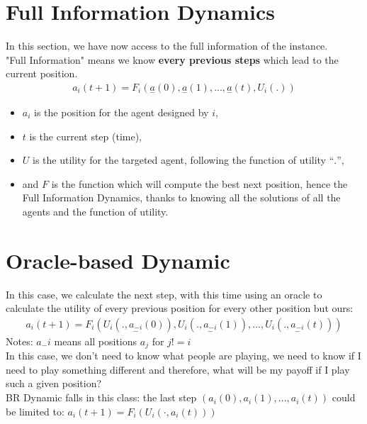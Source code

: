 \section{Full Information Dynamics}
In this section, we have now access to the full information of the instance.\\
"Full Information" means we know \textbf{every previous steps} which lead to the current position.
\begin{equation}\label{eq:10}
\begin{aligned}
a_i(t + 1) = F_i(\underset{-}{a}(0), \underset{-}{a}(1), ..., \underset{-}{a}(t), U_i(.))
\end{aligned}
\end{equation}
\begin{itemize}
\item $a_i$ is the position for the agent designed by $i$,
\item $t$ is the current step (time),
\item $U$ is the utility for the targeted agent, following the function of utility “$.$”,
\item and $F$ is the function which will compute the best next position, hence the Full Information Dynamics, thanks to knowing all the solutions of all the agents and the function of utility.
\end{itemize}
\section{Oracle-based Dynamic}
In this case, we calculate the next step, with this time using an oracle to calculate the utility of every previous position for every other position but ours:
\begin{equation}\label{eq:11}
\begin{aligned}
a_i(t + 1) = F_i(U_i(., \underset{-}{a_{-i}}(0)), U_i(., \underset{-}{a_{-i}}(1)), ..., U_i(., \underset{-}{a_{-i}}(t)))
\end{aligned}
\end{equation}
Notes: $a_-i$ means all positions $a_j$ for $j != i$\\
In this case, we don't need to know what people are playing, we need to know if I need to play something different and therefore, what will be my payoff if I play such a given position?\\
BR Dynamic falls in this class: the last step $(a_i(0), a_i(1), ..., a_i(t))$ could be limited to: $a_i(t + 1) = F_i(U_i(⋅, a_i(t)))$
